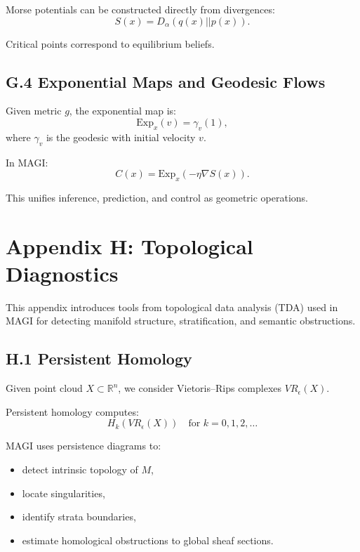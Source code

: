 \documentclass[11pt,a4paper,twocolumn]{article}
\begin{document}
Morse potentials can be constructed directly from divergences:
\[
S(x) = D_\alpha(q(x) || p(x)).
\]

Critical points correspond to equilibrium beliefs.


\subsection*{G.4 Exponential Maps and Geodesic Flows}

Given metric $g$, the exponential map is:
\[
\mathrm{Exp}_x(v) = \gamma_v(1),
\]
where $\gamma_v$ is the geodesic with initial velocity $v$.

In MAGI:
\[
C(x) = \mathrm{Exp}_x(-\eta \nabla S(x)).
\]

This unifies inference, prediction, and control as geometric operations.


\section*{Appendix H: Topological Diagnostics}

This appendix introduces tools from topological data analysis (TDA)
used in MAGI for detecting manifold structure, stratification, and
semantic obstructions.


\subsection*{H.1 Persistent Homology}

Given point cloud $X \subset \mathbb{R}^n$, we consider Vietoris--Rips
complexes $VR_\epsilon(X)$.

Persistent homology computes:
\[
H_k(VR_\epsilon(X))
\quad \text{for } k = 0,1,2,\dots
\]

MAGI uses persistence diagrams to:
\begin{itemize}
\item detect intrinsic topology of $M$,
\item locate singularities,
\item identify strata boundaries,
\item estimate homological obstructions to global sheaf sections.
\end{itemize}
\end{document}
